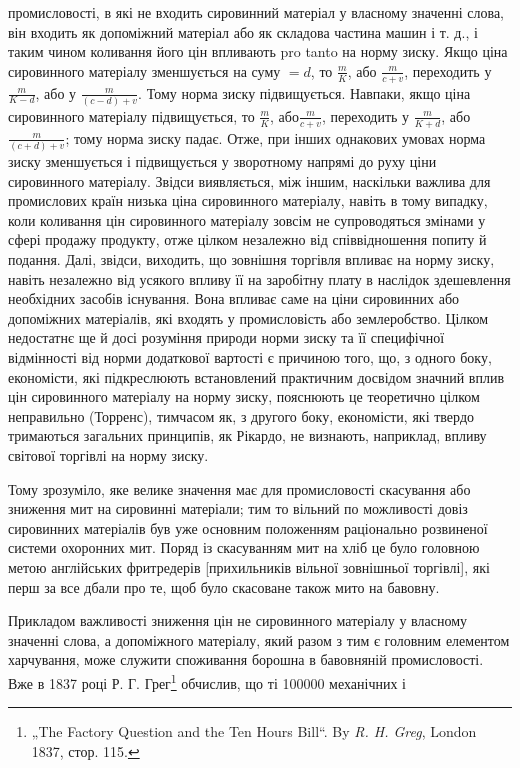 \parcont{}  %
промисловості, в які не входить сировинний матеріал у власному значенні слова, він входить як
допоміжний матеріал або як складова частина машин і т. д., і таким чином коливання його цін
впливають pro tanto на норму зиску. Якщо ціна сировинного матеріалу зменшується на суму $= d$, то $\frac{m}{K}$,
або $\frac{m}{c + v}$, переходить у $\frac{m}{K - d}$, або у
$\frac{m}{(c - d) + v}$. Тому норма зиску підвищується. Навпаки, якщо ціна сировинного матеріалу
підвищується, то $\frac{m}{K}$, або$\frac{m}{c + v}$, переходить у $\frac{m}{K + d}$,
або $\frac{m}{(c + d) + v}$; тому норма зиску
падає. Отже, при інших однакових умовах норма
зиску зменшується і підвищується у зворотному напрямі до руху ціни сировинного матеріалу. Звідси
виявляється, між іншим, наскільки важлива для промислових країн низька ціна сировинного матеріалу,
навіть в тому випадку, коли коливання цін сировинного матеріалу зовсім не супроводяться змінами у
сфері продажу продукту, отже цілком незалежно від співвідношення попиту й подання. Далі, звідси,
виходить, що зовнішня торгівля впливає на норму зиску, навіть незалежно від усякого впливу її на
заробітну плату в наслідок здешевлення необхідних засобів існування. Вона впливає саме на ціни
сировинних або допоміжних матеріалів, які входять у промисловість або землеробство. Цілком
недостатнє ще й досі розуміння природи норми зиску та її специфічної відмінності від норми
додаткової вартості є причиною того, що, з одного боку, економісти, які підкреслюють встановлений
практичним досвідом значний вплив цін сировинного матеріалу на норму зиску, пояснюють це теоретично
цілком неправильно (Торренс), тимчасом як, з другого боку, економісти, які твердо тримаються
загальних принципів, як Рікардо, не визнають, наприклад, впливу світової торгівлі на норму зиску.

Тому зрозуміло, яке велике значення має для промисловості скасування або зниження мит на сировинні
матеріали; тим то вільний по можливості довіз сировинних матеріалів був уже основним положенням
раціонально розвиненої системи охоронних мит. Поряд із скасуванням мит на хліб це було головною
метою англійських фритредерів [прихильників вільної зовнішньої торгівлі], які перш за все дбали про
те, щоб було скасоване також мито на бавовну.

Прикладом важливості зниження цін не сировинного матеріалу у власному значенні слова, а допоміжного
матеріалу, який разом з тим є головним елементом харчування, може служити споживання борошна в
бавовняній промисловості. Вже в 1837 році Р. Г. Грег\footnote{
„The Factory Question and the Ten Hours Bill“. By \emph{R. H. Greg}, London 1837, стор. 115.
} обчислив, що ті 100000 механічних і
\parbreak{}  %
